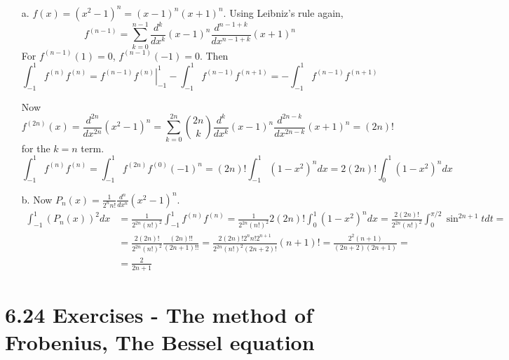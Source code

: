 \documentclass[twoside]{amsart}
\theoremstyle{plain}
\theoremstyle{definition}
\newcommand{\exercisehead}[1]
  {
   \noindent{\small\bf Exercise #1.}
   \smallskip}
\begin{document}
\exercisehead{10} \begin{itemize}
\item[a.] $f(x) = (x^2-1)^n = (x-1)^n (x+1)^n$.  Using Leibniz's rule again,
\[
f^{(n-1)} = \sum_{k=0}^{n-1} \frac{d^k}{dx^k} (x-1)^n \frac{d^{n-1 +k}}{ dx^{n-1+k}} (x+1)^n
\]
For $f^{(n-1)}(1)=0$, $f^{(n-1)}(-1)=0$.  Then
\[
\int_{-1}^1 f^{(n)} f^{(n)} = \left. f^{(n-1)}f^{(n)} \right|_{-1}^1 - \int_{-1}^1 f^{(n-1)} f^{(n+1)} = -\int_{-1}^1 f^{(n-1)} f^{(n+1)}
\]

Now
\[
f^(2n)(x) = \frac{d^{2n}}{ dx^{2n}} (x^2-1)^n = \sum_{k=0}^{2n} \binom{2n}{k} \frac{d^k }{dx^k}(x-1)^n \frac{d^{2n-k}}{ dx^{2n-k}} (x+1)^n = (2n)!
\]
for the $k=n$ term.  
\[
\int_{-1}^1 f^{(n)} f^{(n)} = \int_{-1}^1 f^{(2n)} f^{(0)} (-1)^n = (2n)! \int_{-1}^1 (1-x^2)^n dx = 2(2n)! \int_0^1 (1-x^2)^n dx
\]
\item[b.] Now $P_n(x) = \frac{1}{2^n n!} \frac{d^n}{dx^n} ( x^2-1)^n$.  
\[
\begin{aligned}
  \int_{-1}^1 (P_n(x))^2 dx &= \frac{1}{ 2^{2n} (n!)^2} \int_{-1}^1 f^{(n)}f^{(n)} = \frac{1}{ 2^{2n}(n!)^2} 2(2n)! \int_0^1 (1-x^2)^n dx  = \frac{2 (2n)! }{2^{2n} (n!)^2} \int_0^{\pi/2} \sin^{2n+1}{t} dt = \\
  & = \frac{2 (2n)!}{ 2^{2n} (n!)^2} \frac{ (2n)!!}{ (2n+1)!!} = \frac{2(2n)! 2^n n! 2^{n+1}}{ 2^{2n}(n!)^2 (2n+2)! } (n+1)! = \frac{ 2^2(n+1)}{(2n+2)(2n+1)} = \\
  & = \boxed{ \frac{2}{2n+1}}
\end{aligned}
\]
\end{itemize}




















\section*{ 6.24 Exercises - The method of Frobenius, The Bessel equation }
\end{document}
